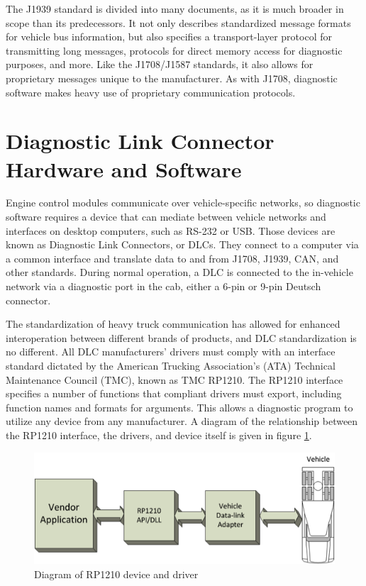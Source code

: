 The J1939 standard is divided into many documents, as it is much broader in scope than its predecessors. It not only describes standardized
message formats for vehicle bus information, but also specifies a transport-layer protocol for transmitting long messages, protocols for
direct memory access for diagnostic purposes, and more. Like the J1708/J1587 standards, it also allows for proprietary messages unique
to the manufacturer. As with J1708, diagnostic software makes heavy use of proprietary communication protocols.

\section{Diagnostic Link Connector Hardware and Software}

Engine control modules communicate over vehicle-specific networks, so diagnostic software requires a device that can mediate between
vehicle networks and interfaces on desktop computers, such as RS-232 or USB. Those devices are known as Diagnostic Link Connectors, or DLCs.
They connect to a computer via a common interface and translate data to and from J1708, J1939, CAN, and other standards. During normal
operation, a DLC is connected to the in-vehicle network via a diagnostic port in the cab, either a 6-pin or 9-pin Deutsch connector.

The standardization of heavy truck communication has allowed for enhanced interoperation between different brands of products, and DLC
standardization is no different. All DLC manufacturers' drivers must comply with an interface standard dictated by the American Trucking Association's (ATA)
Technical Maintenance Council (TMC), known as TMC RP1210\cite{RP1210}. The RP1210 interface specifies a number of functions that compliant drivers must export,
including function names and formats for arguments. This allows a diagnostic program to utilize any device from any manufacturer. A diagram of the relationship between
the RP1210 interface, the drivers, and device itself is given in figure \ref{fig:rp1210}.

\begin{figure}[h]
  \centering
  \includegraphics{RP1210}
  \caption{Diagram of RP1210 device and driver}
  \label{fig:rp1210}
\end{figure}

